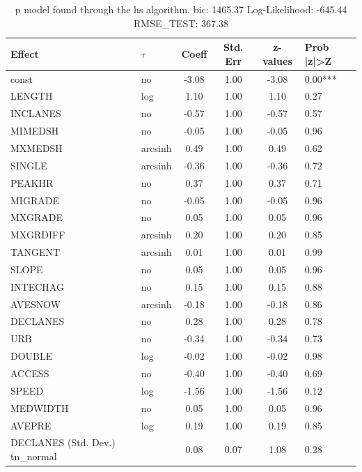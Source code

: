 \begin{table}
	\caption{p model found through the hs algorithm. bic: 1465.37 Log-Likelihood: -645.44 RMSE_TEST: 367.38}
	\begin{center}
		\begin{tabular}{|l|l|c|c|c|l|}
			\hline
			Effect & $\tau$ & Coeff & Std. Err & z-values & Prob |z|>Z \\
			\hline
			const & no & -3.08 & 1.00 & -3.08 & 0.00*** \\
			\hline
			LENGTH & log & 1.10 & 1.00 & 1.10 & 0.27 \\
			\hline
			INCLANES & no & -0.57 & 1.00 & -0.57 & 0.57 \\
			\hline
			MIMEDSH & no & -0.05 & 1.00 & -0.05 & 0.96 \\
			\hline
			MXMEDSH & arcsinh & 0.49 & 1.00 & 0.49 & 0.62 \\
			\hline
			SINGLE & arcsinh & -0.36 & 1.00 & -0.36 & 0.72 \\
			\hline
			PEAKHR & no & 0.37 & 1.00 & 0.37 & 0.71 \\
			\hline
			MIGRADE & no & -0.05 & 1.00 & -0.05 & 0.96 \\
			\hline
			MXGRADE & no & 0.05 & 1.00 & 0.05 & 0.96 \\
			\hline
			MXGRDIFF & arcsinh & 0.20 & 1.00 & 0.20 & 0.85 \\
			\hline
			TANGENT & arcsinh & 0.01 & 1.00 & 0.01 & 0.99 \\
			\hline
			SLOPE & no & 0.05 & 1.00 & 0.05 & 0.96 \\
			\hline
			INTECHAG & no & 0.15 & 1.00 & 0.15 & 0.88 \\
			\hline
			AVESNOW & arcsinh & -0.18 & 1.00 & -0.18 & 0.86 \\
			\hline
			DECLANES & no & 0.28 & 1.00 & 0.28 & 0.78 \\
			\hline
			URB & no & -0.34 & 1.00 & -0.34 & 0.73 \\
			\hline
			DOUBLE & log & -0.02 & 1.00 & -0.02 & 0.98 \\
			\hline
			ACCESS & no & -0.40 & 1.00 & -0.40 & 0.69 \\
			\hline
			SPEED & log & -1.56 & 1.00 & -1.56 & 0.12 \\
			\hline
			MEDWIDTH & no & 0.05 & 1.00 & 0.05 & 0.96 \\
			\hline
			AVEPRE & log & 0.19 & 1.00 & 0.19 & 0.85 \\
			\hline
			DECLANES (Std. Dev.) tn_normal &  & 0.08 & 0.07 & 1.08 & 0.28 \\

\end{tabular}
\end{center}
\end{table}
